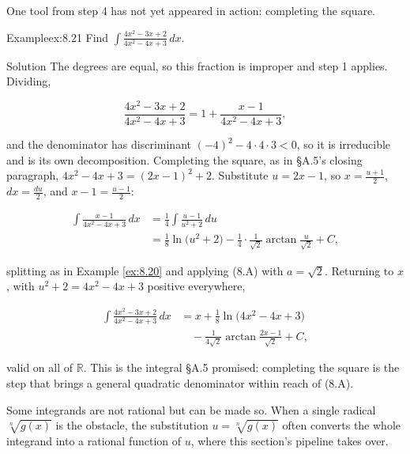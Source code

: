 \documentclass[a4paper,12pt,oneside]{memoir}
\begin{document}
One tool from step 4 has not yet appeared in action: completing the square.

\begin{workedexample}
\begin{envexample}{Example}{ex:8.21}{}
Find \(\displaystyle\int \frac{4x^{2} - 3x + 2}{4x^{2} - 4x + 3}\,dx\).
\end{envexample}
\begin{envsolution}{Solution}{}{}
The degrees are equal, so this fraction is improper and step 1 applies. Dividing,

\[ \frac{4x^{2} - 3x + 2}{4x^{2} - 4x + 3} = 1 + \frac{x - 1}{4x^{2} - 4x + 3}, \]

and the denominator has discriminant \((-4)^{2} - 4\cdot 4\cdot 3 < 0\), so it is irreducible and is its own decomposition. Completing the square, as in §A.5’s closing paragraph, \(4x^{2} - 4x + 3 = (2x - 1)^{2} + 2\). Substitute \(u = 2x - 1\), so \(x = \tfrac{u + 1}{2}\), \(dx = \tfrac{du}{2}\), and \(x - 1 = \tfrac{u - 1}{2}\):

\[ \begin{aligned}
          \int \frac{x - 1}{4x^{2} - 4x + 3}\,dx &= \frac{1}{4}\int \frac{u - 1}{u^{2} + 2}\,du \\[2pt]
            &= \frac{1}{8}\ln\bigl(u^{2} + 2\bigr) - \frac{1}{4}\cdot\frac{1}{\sqrt{2}}\arctan\frac{u}{\sqrt{2}} + C,
        \end{aligned} \]

splitting as in Example \ref{ex:8.20} and applying (8.A) with \(a = \sqrt{2}\). Returning to \(x\), with \(u^{2} + 2 = 4x^{2} - 4x + 3\) positive everywhere,

\[ \begin{aligned}
          \int \frac{4x^{2} - 3x + 2}{4x^{2} - 4x + 3}\,dx &= x + \frac{1}{8}\ln\bigl(4x^{2} - 4x + 3\bigr) \\
            &\quad - \frac{1}{4\sqrt{2}}\arctan\frac{2x - 1}{\sqrt{2}} + C,
        \end{aligned} \]

valid on all of \(\mathbb{R}\). This is the integral §A.5 promised: completing the square is the step that brings a general quadratic denominator within reach of (8.A). \qedmark
\end{envsolution}
\end{workedexample}
Some integrands are not rational but can be made so. When a single radical \(\sqrt[n]{g(x)}\) is the obstacle, the substitution \(u = \sqrt[n]{g(x)}\) often converts the whole integrand into a rational function of \(u\), where this section’s pipeline takes over.
\end{document}
